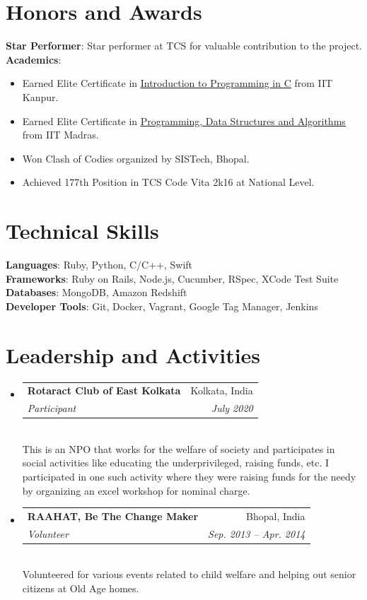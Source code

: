 \documentclass[letterpaper,11pt]{article}
\makeatletter
\newcommand{\resumeItem}[1]{
  \item\small{
    {#1 \vspace{-2pt}}
  }
}
\newcommand{\resumeSubheading}[4]{
  \vspace{-2pt}\item
    \begin{tabular*}{0.97\textwidth}[t]{l@{\extracolsep{\fill}}r}
      \textbf{#1} & #2 \\
      \textit{\small#3} & \textit{\small #4} \\
    \end{tabular*}\vspace{-7pt}
}
\newcommand{\resumeSubHeadingListStart}{\begin{itemize}[leftmargin=0.15in, label={}]}
\newcommand{\resumeSubHeadingListEnd}{\end{itemize}}
\newcommand{\resumeItemListStart}{\begin{itemize}}
\newcommand{\resumeItemListEnd}{\end{itemize}\vspace{-5pt}}
\makeatother
\begin{document}
\section{Honors and Awards}
 \begin{itemize}[leftmargin=0.15in, label={}]
    \small{\item{
     \textbf{Star Performer}{: Star performer at TCS for valuable contribution to the project. } \\
     \textbf{Academics}{:} 
     \resumeItemListStart
        \resumeItem {Earned Elite Certificate in \href{https://nptel.ac.in/noc/Ecertificate/?q=noc15-cs15/NPTEL15CS150614020.jpg}{\underline{Introduction to Programming in C}} from IIT Kanpur.}
        \resumeItem {Earned Elite Certificate in \href{https://nptel.ac.in/noc/Ecertificate/?q=linkedin/noc16-cs06/NPTEL16CS062715051.jpg}{\underline{Programming, Data Structures and Algorithms}} from IIT Madras.}
        \resumeItem {Won Clash of Codies organized by SISTech, Bhopal.}
        \resumeItem {Achieved 177th Position in TCS Code Vita 2k16 at National Level.}
     \resumeItemListEnd
    }}
 \end{itemize}

\section{Technical Skills}
 \begin{itemize}[leftmargin=0.15in, label={}]
    \small{\item{
     \textbf{Languages}{: Ruby, Python, C/C++, Swift } \\
     \textbf{Frameworks}{: Ruby on Rails, Node.js, Cucumber, RSpec, XCode Test Suite } \\
     \textbf{Databases}{: MongoDB, Amazon Redshift } \\
     \textbf{Developer Tools}{: Git, Docker, Vagrant, Google Tag Manager, Jenkins } \\
    }}
 \end{itemize}

\section{Leadership and Activities}
 \resumeSubHeadingListStart
  \resumeSubheading
     {Rotaract Club of East Kolkata}{Kolkata, India}
     {Participant}{July 2020} \vspace{2px} \\
     {This is an NPO that works for the welfare of society and participates in social activities like educating the underprivileged, raising funds, etc. I participated in one such activity where they were raising funds for the needy by organizing an excel workshop for nominal charge.}
  \resumeSubheading
     {RAAHAT, Be The Change Maker}{Bhopal, India}
     {Volunteer}{Sep. 2013 -- Apr. 2014} \vspace{2px} \\
     {Volunteered for various events related to child welfare and helping out senior citizens at Old Age homes.}
 \resumeSubHeadingListEnd
\end{document}
